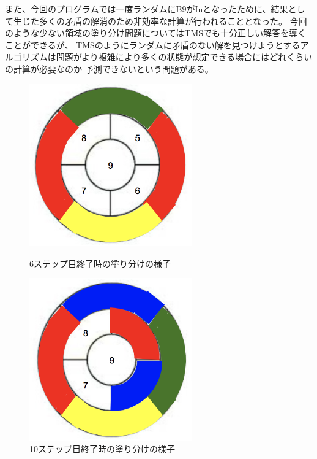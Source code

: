 \documentclass[uplatex]{jsarticle}
\begin{document}
また、今回のプログラムでは一度ランダムにB9がInとなったために、結果として生じた多くの矛盾の解消のため非効率な計算が行われることとなった。
今回のような少ない領域の塗り分け問題についてはTMSでも十分正しい解答を導くことができるが、
TMSのようにランダムに矛盾のない解を見つけようとするアルゴリズムは問題がより複雑により多くの状態が想定できる場合にはどれくらいの計算が必要なのか
予測できないという問題がある。

\begin{figure}[htbp]
\begin{minipage}{0.5\hsize}
 \begin{center}
  \includegraphics[width=70mm]{img/step1.png}
 \end{center}
 \caption{6ステップ目終了時の塗り分けの様子}
 \label{fig:one}
\end{minipage}
\begin{minipage}{0.5\hsize}
 \begin{center}
  \includegraphics[width=70mm]{img/step2.png}
 \end{center}
 \caption{10ステップ目終了時の塗り分けの様子}
 \label{fig:two}
\end{minipage}
\end{figure}
\end{document}
